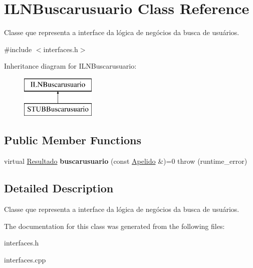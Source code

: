 \hypertarget{classILNBuscarusuario}{}\section{I\+L\+N\+Buscarusuario Class Reference}
\label{classILNBuscarusuario}


Classe que representa a interface da lógica de negócios da busca de usuários.  




{\ttfamily \#include $<$interfaces.\+h$>$}

Inheritance diagram for I\+L\+N\+Buscarusuario\+:\begin{figure}[H]
\begin{center}
\leavevmode
\includegraphics[height=2.000000cm]{classILNBuscarusuario}
\end{center}
\end{figure}
\subsection*{Public Member Functions}
\begin{DoxyCompactItemize}
\item 
\mbox{\label{classILNBuscarusuario_a59ee962adbd72987987b907a28cf531d}} 
virtual \hyperlink{classResultado}{Resultado} {\bfseries buscarusuario} (const \hyperlink{classApelido}{Apelido} \&)=0  throw (runtime\+\_\+error)
\end{DoxyCompactItemize}


\subsection{Detailed Description}
Classe que representa a interface da lógica de negócios da busca de usuários. 

The documentation for this class was generated from the following files\+:\begin{DoxyCompactItemize}
\item 
interfaces.\+h\item 
interfaces.\+cpp\end{DoxyCompactItemize}
